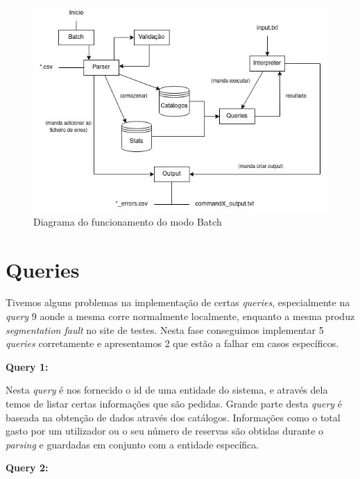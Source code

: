 \documentclass[12pt,a4paper]{report}
\begin{document}
    \begin{figure}[h]
    \includegraphics[scale = 0.6]{Batch.png}
    \centering
    \caption{Diagrama do funcionamento do modo Batch}
    \end{figure} 

    
    \chapter{Queries}
    Tivemos alguns problemas na implementação de certas \textit{queries}, especialmente na \textit{query} 9 aonde a mesma corre normalmente localmente, enquanto a mesma produz \textit{segmentation fault} no site de testes.
    Nesta fase conseguimos implementar 5 \textit{queries} corretamente e apresentamos 2 que estão a falhar em casos específicos.
    
    \textbf{Query 1:}
    \par Nesta \textit{query} é nos fornecido o {id} de uma entidade do sistema, e através dela temos de listar certas informações que são pedidas. Grande parte desta \textit{query} é baseada na obtenção de dados através dos catálogos. Informações como o total gasto por um utilizador ou o seu número de reservas são obtidas durante o \textit{parsing} e guardadas em conjunto com a entidade específica.

    \textbf{Query 2:}
\end{document}
